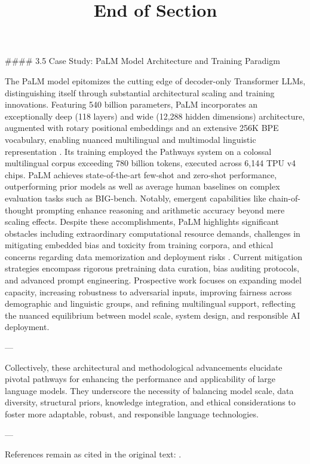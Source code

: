 \documentclass[11pt]{article}
\begin{document}
#### 3.5 Case Study: PaLM Model Architecture and Training Paradigm

The PaLM model epitomizes the cutting edge of decoder-only Transformer LLMs, distinguishing itself through substantial architectural scaling and training innovations. Featuring 540 billion parameters, PaLM incorporates an exceptionally deep (118 layers) and wide (12,288 hidden dimensions) architecture, augmented with rotary positional embeddings and an extensive 256K BPE vocabulary, enabling nuanced multilingual and multimodal linguistic representation \cite{ref7}. Its training employed the Pathways system on a colossal multilingual corpus exceeding 780 billion tokens, executed across 6,144 TPU v4 chips. PaLM achieves state-of-the-art few-shot and zero-shot performance, outperforming prior models as well as average human baselines on complex evaluation tasks such as BIG-bench. Notably, emergent capabilities like chain-of-thought prompting enhance reasoning and arithmetic accuracy beyond mere scaling effects. Despite these accomplishments, PaLM highlights significant obstacles including extraordinary computational resource demands, challenges in mitigating embedded bias and toxicity from training corpora, and ethical concerns regarding data memorization and deployment risks \cite{ref7}. Current mitigation strategies encompass rigorous pretraining data curation, bias auditing protocols, and advanced prompt engineering. Prospective work focuses on expanding model capacity, increasing robustness to adversarial inputs, improving fairness across demographic and linguistic groups, and refining multilingual support, reflecting the nuanced equilibrium between model scale, system design, and responsible AI deployment.

---

Collectively, these architectural and methodological advancements elucidate pivotal pathways for enhancing the performance and applicability of large language models. They underscore the necessity of balancing model scale, data diversity, structural priors, knowledge integration, and ethical considerations to foster more adaptable, robust, and responsible language technologies.

---

References remain as cited in the original text: \cite{ref7, ref8, ref34, ref44, ref46, ref49}.

\title{End of Section}
\maketitle
\end{document}
